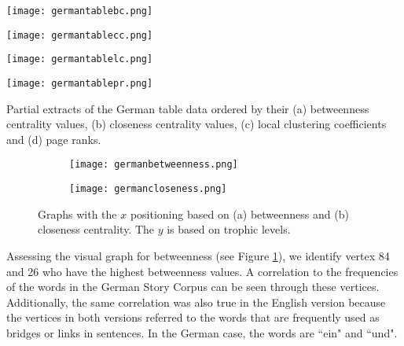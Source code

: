 \begin{table}[!htb]
\centering
\begin{subtable}{.2\textwidth}
	\centering
	\texttt{[image: germantablebc.png]}
	\caption{}
	\label{table:germantablebc}
\end{subtable}
\hfill
\begin{subtable}{.2\textwidth}
	\centering
	\texttt{[image: germantablecc.png]}
	\caption{}
	\label{table:germantablecc}
\end{subtable}
\hfill
\begin{subtable}{.2\textwidth}
	\centering
	\texttt{[image: germantablelc.png]}
	\caption{}
	\label{table:germantablelc}
\end{subtable}
\hfill
\begin{subtable}{.2\textwidth}
	\centering
	\texttt{[image: germantablepr.png]}
	\caption{}
	\label{table:germantablepr}
\end{subtable}
\caption{Partial extracts of the German table data ordered by their (a) betweenness centrality values, (b) closeness centrality values, (c) local clustering coefficients and (d) page ranks.}
\label{table:germandata}
\end{table}

\begin{figure}[!htb]
\centering
\begin{subfigure}{.45\textwidth}
	\hspace{-1cm} 
	\texttt{[image: germanbetweenness.png]}
	\caption{}
	\label{fig:gerbc}
\end{subfigure}
\hfill
\begin{subfigure}{.45\textwidth}
	\hspace{-1cm} 
	\texttt{[image: germancloseness.png]}
	\caption{ }
	\label{fig:gercc}
\end{subfigure}
\caption{Graphs with the $x$ positioning based on (a) betweenness and (b) closeness centrality. The $y$ is based on trophic levels.}
\label{fig:gercentrality}
\end{figure}

Assessing the visual graph for betweenness (see Figure \ref{fig:gerbc}), we identify vertex 84 and 26 who have the highest betweenness  values. A correlation to the frequencies of the words in the German Story Corpus can be seen through these vertices. Additionally, the same correlation was also true in the English version because the vertices in both versions referred to the words that are frequently used as bridges or links in sentences. In the German case, the words are ``ein" and ``und".


